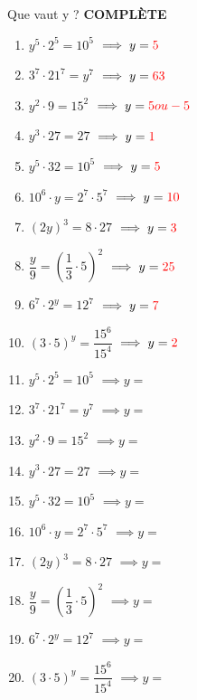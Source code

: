 \question[10]
Que vaut y ? \textbf{COMPLÈTE}

\begin{multicols}{2}
	\begin{enumerate}[label=\alph*)]
		\ifdefined\withanswers %
		\item \( y^5 \cdot 2^5 = 10^5 \) \(\implies  y = \color{red}{ 5} \)
		\item \( 3^7 \cdot 21^7 = y^7 \) \(\implies  y = \color{red}{ 63} \)
		\item \( y^2 \cdot 9 = 15^2 \) \(\implies  y = \color{red}{ 5 ou -5} \)
		\item \( y^3 \cdot 27 = 27 \) \(\implies  y = \color{red}{ 1} \)
		\item \( y^5 \cdot 32 = 10^5 \) \(\implies  y = \color{red}{ 5 } \)
		\item \( 10^6 \cdot y = 2^7 \cdot 5^7 \) \(\implies  y = \color{red}{ 10} \)
		\item \( \left(2y\right)^3 = 8 \cdot 27 \) \(\implies  y = \color{red}{ 3} \)
		\item \( \dfrac{y}{9} = \left(\dfrac{1}{3} \cdot 5\right)^2 \) \(\implies  y = \color{red}{ 25} \)
		\item \( 6^7 \cdot 2^y = 12^7 \) \(\implies  y = \color{red}{ 7} \)
		\item \( \left(3 \cdot 5\right)^y = \dfrac{15^6}{15^4} \) \(\implies  y = \color{red}{ 2 } \)
		      \else
		\item \( y^5 \cdot 2^5 = 10^5 \) \(\implies y = \)
		\item \( 3^7 \cdot 21^7 = y^7 \) \(\implies y = \)
		\item \( y^2 \cdot 9 = 15^2 \) \(\implies y = \)
		\item \( y^3 \cdot 27 = 27 \) \(\implies y = \)
		\item \( y^5 \cdot 32 = 10^5 \) \(\implies y = \)
		\item \( 10^6 \cdot y = 2^7 \cdot 5^7 \) \(\implies y = \)
		\item \( \left(2y\right)^3 = 8 \cdot 27 \) \(\implies y = \)
		\item \( \dfrac{y}{9} = \left(\dfrac{1}{3} \cdot 5\right)^2 \) \(\implies y = \)
		\item \( 6^7 \cdot 2^y = 12^7 \) \(\implies y = \)
		\item \( \left(3 \cdot 5\right)^y = \dfrac{15^6}{15^4} \) \(\implies y = \)

		      \fi
	\end{enumerate}
\end{multicols}
